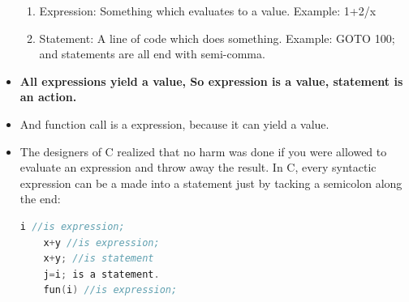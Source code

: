\documentclass[a4paper,12pt,twoside]{book}
\begin{document}
\begin{itemize}
    \begin{enumerate}
    	\item Expression: Something which evaluates to a value. Example: 1+2/x
    	\item Statement: A line of code which does something. Example: GOTO 100; and statements are all end with semi-comma.
    \end{enumerate}
    
    \item \textbf{All expressions yield a value, So expression is a value, statement is an action.}
    
    \item And function call is a expression, because it can yield a value.
    
    \item The designers of C realized that no harm was done if you were allowed to evaluate an expression and throw away the result. In C, every syntactic expression can be a made into a statement just by tacking a semicolon along the end:
    
    \begin{lstlisting}[frame=single, language=c++]
    i //is expression;
    x+y //is expression;
    x+y; //is statement
    j=i; is a statement.
    fun(i) //is expression;
    \end{lstlisting}
    
\end{itemize}
\end{document}
